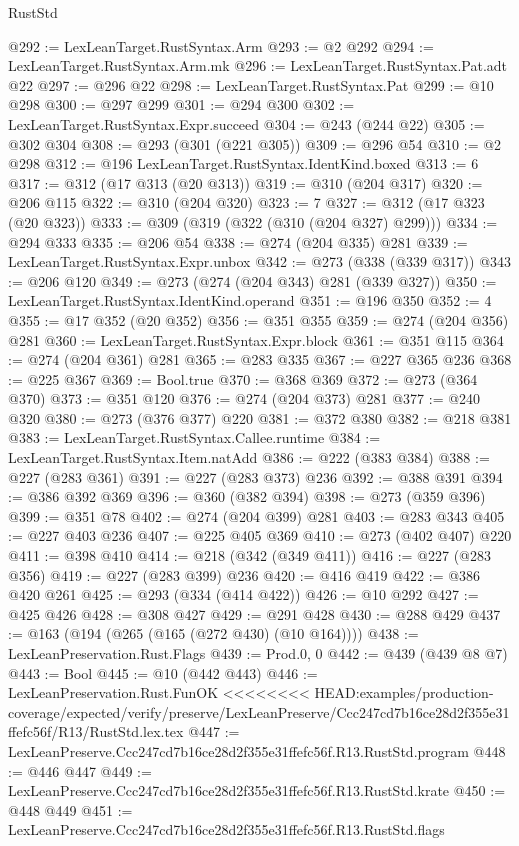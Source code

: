 \begin{lexlean}{RustStd}
\begin{coremodule}
{\begin{coremodule}
{{{{{{@292 := LexLeanTarget.RustSyntax.Arm
@293 := @2 @292
@294 := LexLeanTarget.RustSyntax.Arm.mk
@296 := LexLeanTarget.RustSyntax.Pat.adt @22
@297 := @296 @22
@298 := LexLeanTarget.RustSyntax.Pat
@299 := @10 @298
@300 := @297 @299
@301 := @294 @300
@302 := LexLeanTarget.RustSyntax.Expr.succeed
@304 := @243 (@244 @22)
@305 := @302 @304
@308 := @293 (@301 (@221 @305))
@309 := @296 @54
@310 := @2 @298
@312 := @196 LexLeanTarget.RustSyntax.IdentKind.boxed
@313 := 6
@317 := @312 (@17 @313 (@20 @313))
@319 := @310 (@204 @317)
@320 := @206 @115
@322 := @310 (@204 @320)
@323 := 7
@327 := @312 (@17 @323 (@20 @323))
@333 := @309 (@319 (@322 (@310 (@204 @327) @299)))
@334 := @294 @333
@335 := @206 @54
@338 := @274 (@204 @335) @281
@339 := LexLeanTarget.RustSyntax.Expr.unbox
@342 := @273 (@338 (@339 @317))
@343 := @206 @120
@349 := @273 (@274 (@204 @343) @281 (@339 @327))
@350 := LexLeanTarget.RustSyntax.IdentKind.operand
@351 := @196 @350
@352 := 4
@355 := @17 @352 (@20 @352)
@356 := @351 @355
@359 := @274 (@204 @356) @281
@360 := LexLeanTarget.RustSyntax.Expr.block
@361 := @351 @115
@364 := @274 (@204 @361) @281
@365 := @283 @335
@367 := @227 @365 @236
@368 := @225 @367
@369 := Bool.true
@370 := @368 @369
@372 := @273 (@364 @370)
@373 := @351 @120
@376 := @274 (@204 @373) @281
@377 := @240 @320
@380 := @273 (@376 @377) @220
@381 := @372 @380
@382 := @218 @381
@383 := LexLeanTarget.RustSyntax.Callee.runtime
@384 := LexLeanTarget.RustSyntax.Item.natAdd
@386 := @222 (@383 @384)
@388 := @227 (@283 @361)
@391 := @227 (@283 @373) @236
@392 := @388 @391
@394 := @386 @392 @369
@396 := @360 (@382 @394)
@398 := @273 (@359 @396)
@399 := @351 @78
@402 := @274 (@204 @399) @281
@403 := @283 @343
@405 := @227 @403 @236
@407 := @225 @405 @369
@410 := @273 (@402 @407) @220
@411 := @398 @410
@414 := @218 (@342 (@349 @411))
@416 := @227 (@283 @356)
@419 := @227 (@283 @399) @236
@420 := @416 @419
@422 := @386 @420 @261
@425 := @293 (@334 (@414 @422))
@426 := @10 @292
@427 := @425 @426
@428 := @308 @427
@429 := @291 @428
@430 := @288 @429
@437 := @163 (@194 (@265 (@165 (@272 @430) (@10 @164))))
@438 := LexLeanPreservation.Rust.Flags
@439 := Prod.{0, 0}
@442 := @439 (@439 @8 @7)
@443 := Bool
@445 := @10 (@442 @443)
@446 := LexLeanPreservation.Rust.FunOK
<<<<<<<< HEAD:examples/production-coverage/expected/verify/preserve/LexLeanPreserve/Ccc247cd7b16ce28d2f355e31ffefc56f/R13/RustStd.lex.tex
@447 := LexLeanPreserve.Ccc247cd7b16ce28d2f355e31ffefc56f.R13.RustStd.program
@448 := @446 @447
@449 := LexLeanPreserve.Ccc247cd7b16ce28d2f355e31ffefc56f.R13.RustStd.krate
@450 := @448 @449
@451 := LexLeanPreserve.Ccc247cd7b16ce28d2f355e31ffefc56f.R13.RustStd.flags
}}}}}}
\end{coremodule}}
\end{coremodule}
\end{lexlean}
